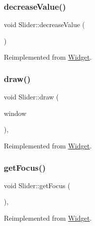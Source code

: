 \subsubsection{\texorpdfstring{decreaseValue()}{decreaseValue()}}
{\footnotesize\ttfamily void Slider\+::decrease\+Value (\begin{DoxyParamCaption}{ }\end{DoxyParamCaption})\hspace{0.3cm}{\ttfamily [virtual]}}



Reimplemented from \mbox{\hyperlink{class_widget_a1e265a65e224ff231f98dfd490c08c3c}{Widget}}.

\mbox{\label{class_slider_a8d2355aa14e267385d7d0f79300ffc6b}} 
\subsubsection{\texorpdfstring{draw()}{draw()}}
{\footnotesize\ttfamily void Slider\+::draw (\begin{DoxyParamCaption}\item[{sf\+::\+Render\+Window \&}]{window }\end{DoxyParamCaption})\hspace{0.3cm}{\ttfamily [override]}, {\ttfamily [virtual]}}



Reimplemented from \mbox{\hyperlink{class_widget_ae33a60123dee736ad8ece7277711f3d4}{Widget}}.

\mbox{\label{class_slider_aacedd16fdfd8b44067e0c8fd5b908b69}} 
\subsubsection{\texorpdfstring{getFocus()}{getFocus()}}
{\footnotesize\ttfamily void Slider\+::get\+Focus (\begin{DoxyParamCaption}{ }\end{DoxyParamCaption})\hspace{0.3cm}{\ttfamily [override]}, {\ttfamily [virtual]}}



Reimplemented from \mbox{\hyperlink{class_widget_a546c3b96bd793596c4902b4df0c41272}{Widget}}.

